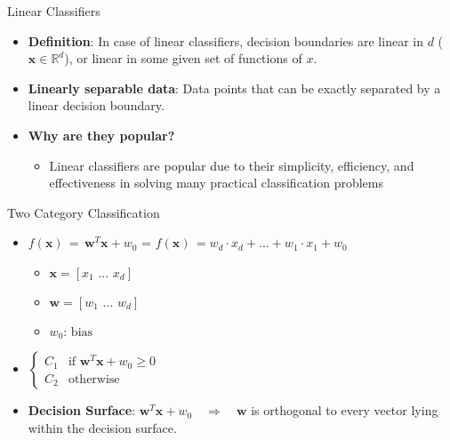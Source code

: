 \documentclass[serif, aspectratio=169]{beamer}
\begin{document}
\begin{frame}{Linear Classifiers}
    \begin{itemize}\itemsep1.5em
        \item \justifying \textbf{Definition}: In case of linear classifiers, decision boundaries are linear in $d$ (\(\mathbf{x} \in \mathbb{R}^d\)), or linear in some given set of functions of $x$.
        \item \justifying \textbf{Linearly separable data}: Data points that can be exactly separated by a linear decision boundary.
        \item \textbf{Why are they popular?}
        \begin{itemize}
            \item \justifying Linear classifiers are popular due to their simplicity, efficiency, and effectiveness in solving many practical classification problems
        \end{itemize}
    \end{itemize}
\end{frame}

\begin{frame}{Two Category Classification}
    \begin{itemize}\itemsep1.5em
        \item \(f(\mathbf{x}) \, = \, \mathbf{w}^T\mathbf{x} + w_0\) = 
        \(f(\mathbf{x}) \, = w_d \cdot x_d + ... + w_1 \cdot x_1 + w_0\)
        \begin{itemize}
            \item \(\mathbf{x} = [x_1 \, \, ... \, \, x_d]\)
            \item \(\mathbf{w} = [w_1 \, \, ... \, \, w_d]\)
            \item \(w_0 \text{: bias}\)
        \end{itemize}
        \item \(
            \begin{cases} 
                C_1 & \text{if } \mathbf{w}^T\mathbf{x} + w_0 \geq 0 \\
                C_2 & \text{otherwise}
            \end{cases}
            \)
        \item \justifying \textbf{Decision Surface}: \(\mathbf{w}^T\mathbf{x} + w_0 \quad \Longrightarrow \quad \mathbf{w}\) is orthogonal to every vector lying within the decision surface.
    \end{itemize}
\end{frame}
\end{document}
